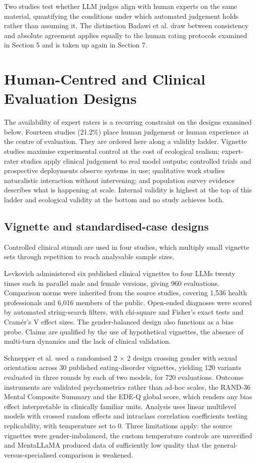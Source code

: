 \documentclass[11pt]{article}
\begin{document}
	Two studies test whether LLM judges align with human experts on the same material, quantifying the conditions under which automated judgement holds rather than assuming it. The distinction Badawi et al. draw between consistency and absolute agreement applies equally to the human rating protocols examined in Section 5 and is taken up again in Section 7.
	\section{Human-Centred and Clinical Evaluation Designs}
	
	The availability of expert raters is a recurring constraint on the designs examined below. Fourteen studies (21.2\%) place human judgement or human experience at the centre of evaluation. They are ordered here along a validity ladder. Vignette studies maximise experimental control at the cost of ecological realism; expert-rater studies apply clinical judgement to real model outputs; controlled trials and prospective deployments observe systems in use; qualitative work studies naturalistic interaction without intervening; and population survey evidence describes what is happening at scale. Internal validity is highest at the top of this ladder and ecological validity at the bottom and no study achieves both.
	
	\subsection{Vignette and standardised-case designs}
	
	Controlled clinical stimuli are used in four studies, which multiply small vignette sets through repetition to reach analysable sample sizes.
	
	Levkovich\cite{ejihpe15010009} administered six published clinical vignettes to four LLMs twenty times each in parallel male and female versions, giving 960 evaluations. Comparison norms were inherited from the source studies, covering 1,536 health professionals and 6,016 members of the public. Open-ended diagnoses were scored by automated string-search filters, with chi-square and Fisher's exact tests and Cram\'er's V effect sizes. The gender-balanced design also functions as a bias probe. Claims are qualified by the use of hypothetical vignettes, the absence of multi-turn dynamics and the lack of clinical validation.
	
	Schnepper et al.\cite{SCHNEPPER2025} used a randomised 2 $\times$ 2 design crossing gender with sexual orientation across 30 published eating-disorder vignettes, yielding 120 variants evaluated in three rounds by each of two models, for 720 evaluations. Outcome instruments are validated psychometrics rather than ad-hoc scales, the RAND-36 Mental Composite Summary and the EDE-Q global score, which renders any bias effect interpretable in clinically familiar units. Analysis uses linear multilevel models with crossed random effects and intraclass correlation coefficients testing replicability, with temperature set to 0. Three limitations apply: the source vignettes were gender-imbalanced, the custom temperature controls are unverified and MentaLLaMA produced data of sufficiently low quality that the general-versus-specialised comparison is weakened.
	
\end{document}
